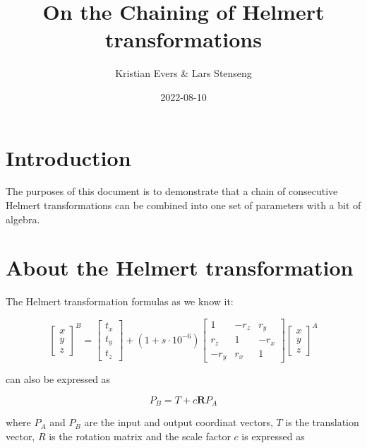 \documentclass[11pt,twocolumn]{article}
\title{On the Chaining of Helmert transformations}
\author{Kristian Evers \& Lars Stenseng}
\date{2022-08-10}
\newcommand{\matr}[1]{\mathbf{#1}}
\begin{document}
\maketitle

\section{Introduction}

The purposes of this document is to demonstrate that a chain of consecutive
Helmert transformations can be combined into one set of parameters with a bit of
algebra.

\section{About the Helmert transformation}

The Helmert transformation formulas as we know it:

\begin{equation}
    \begin{bmatrix}
        x
        \\ 
        y
        \\ 
        z
    \end{bmatrix}^B
%
    =
%
    \begin{bmatrix}
        t_x \\ t_y \\ t_z
    \end{bmatrix}
%
    + (1+s\cdot10^{-6})
%
    \begin{bmatrix}
        1       & -r_{z}  &  r_{y}   \\ 
        r_{z}   &  1      & -r_{x} \\ 
        -r_{y}   &  r_{x}  &  1
    \end{bmatrix}
%
    \begin{bmatrix}
        x \\ y \\ z
    \end{bmatrix}^A
\end{equation}

can also be expressed as

\begin{equation}
    \label{eq:simplehelmert}
    P_{B} = T + c\matr{R}P_{A}
\end{equation}

where $P_{A}$ and $P_{B}$ are the input and output coordinat vectors,
$T$ is the translation vector, $R$ is the rotation matrix and the scale
factor $c$ is expressed as
\end{document}
